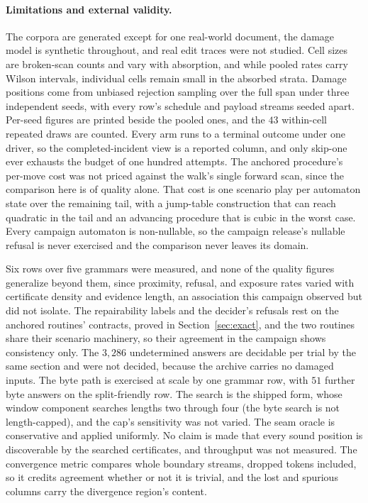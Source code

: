 \documentclass[11pt,a4paper]{article}
\theoremstyle{definition}
\theoremstyle{plain}
\theoremstyle{remark}
\begin{document}
\paragraph{Limitations and external validity.} The corpora are generated except for one real-world document, the damage
model is synthetic throughout, and real edit traces were not studied. Cell sizes are broken-scan counts and vary with
absorption, and while pooled rates carry Wilson intervals, individual cells remain small in the absorbed strata. Damage
positions come from unbiased rejection sampling over the full span under three independent seeds, with every row's
schedule and payload streams seeded apart. Per-seed figures are printed beside the pooled ones, and the $43$ within-cell
repeated draws are counted. Every arm runs to a terminal outcome under one driver, so the completed-incident view is a
reported column, and only skip-one ever exhausts the budget of one hundred attempts. The anchored procedure's per-move
cost was not priced against the walk's single forward scan, since the comparison here is of quality alone. That cost is
one scenario play per automaton state over the remaining tail, with a jump-table construction that can reach quadratic
in the tail and an advancing procedure that is cubic in the worst case. Every campaign automaton is non-nullable, so the
campaign release's nullable refusal is never exercised and the comparison never leaves its domain.

Six rows over five grammars were measured, and none of the quality figures generalize beyond them, since proximity,
refusal, and exposure rates varied with certificate density and evidence length, an association this campaign observed
but did not isolate. The repairability labels and the decider's refusals rest on the anchored routines' contracts,
proved in Section~\ref{sec:exact}, and the two routines share their scenario machinery, so their agreement in the
campaign shows consistency only. The $3{,}286$ undetermined answers are decidable per trial by the same section and were
not decided, because the archive carries no damaged inputs. The byte path is exercised at scale by one grammar row, with
$51$ further byte answers on the split-friendly row. The search is the shipped form, whose window component searches
lengths two through four (the byte search is not length-capped), and the cap's sensitivity was not varied. The seam
oracle is conservative and applied uniformly. No claim is made that every sound position is discoverable by the searched
certificates, and throughput was not measured. The convergence metric compares whole boundary streams, dropped tokens
included, so it credits agreement whether or not it is trivial, and the lost and spurious columns carry the divergence
region's content.
\end{document}
